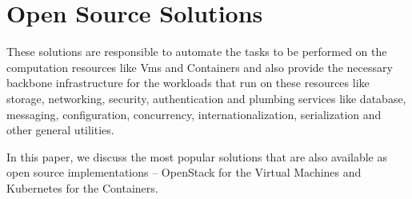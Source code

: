 \newpage
\section{Open Source Solutions}

These solutions are responsible to automate the tasks to be performed on the computation resources like Vms and Containers and also provide the necessary backbone infrastructure for the workloads that run on these resources like storage, networking, security, authentication and plumbing services like database, messaging, configuration, concurrency, internationalization, serialization and other general utilities.

In this paper, we discuss the most popular solutions that are also available as open source implementations – OpenStack for the Virtual Machines and Kubernetes for the Containers.
